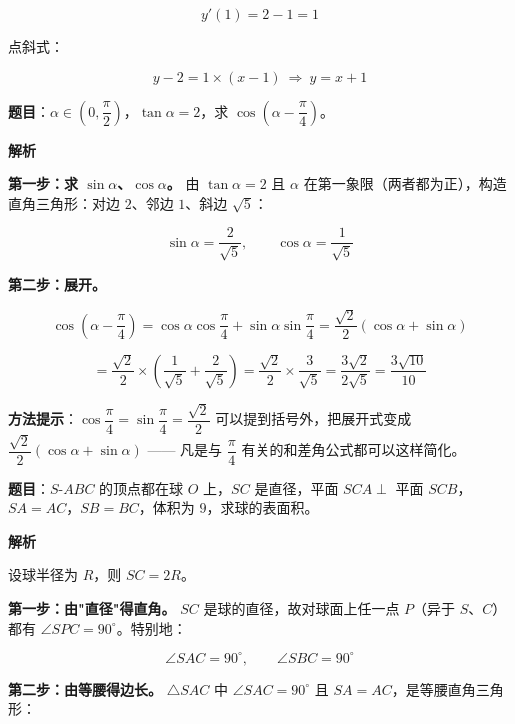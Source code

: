 \[y'(1)=2-1=1\]

点斜式：

\[y-2=1\times(x-1)\ \Longrightarrow\ y=x+1\]


\par\medskip


\textbf{题目}：$\alpha\in\left(0,\dfrac\pi2\right)$，$\tan\alpha=2$，求 $\cos\left(\alpha-\dfrac\pi4\right)$。

\textbf{解析}

\textbf{第一步：求 $\sin\alpha$、$\cos\alpha$。} 由 $\tan\alpha=2$ 且 $\alpha$ 在第一象限（两者都为正），构造直角三角形：对边 $2$、邻边 $1$、斜边 $\sqrt5$：

\[\sin\alpha=\frac2{\sqrt5},\qquad \cos\alpha=\frac1{\sqrt5}\]

\textbf{第二步：展开。}

\[\cos\left(\alpha-\frac\pi4\right)=\cos\alpha\cos\frac\pi4+\sin\alpha\sin\frac\pi4=\frac{\sqrt2}2\left(\cos\alpha+\sin\alpha\right)\]

\[=\frac{\sqrt2}2\times\left(\frac1{\sqrt5}+\frac2{\sqrt5}\right)=\frac{\sqrt2}2\times\frac3{\sqrt5}=\frac{3\sqrt2}{2\sqrt5}=\frac{3\sqrt{10}}{10}\]


\begin{gktip}
\textbf{方法提示}：$\cos\dfrac\pi4=\sin\dfrac\pi4=\dfrac{\sqrt2}2$ 可以提到括号外，把展开式变成 $\dfrac{\sqrt2}2(\cos\alpha+\sin\alpha)$ —— 凡是与 $\dfrac\pi4$ 有关的和差角公式都可以这样简化。
\end{gktip}

\par\medskip


\textbf{题目}：$S\text{-}ABC$ 的顶点都在球 $O$ 上，$SC$ 是直径，平面 $SCA\perp$ 平面 $SCB$，$SA=AC$，$SB=BC$，体积为 $9$，求球的表面积。

\textbf{解析}

设球半径为 $R$，则 $SC=2R$。

\textbf{第一步：由"直径"得直角。} $SC$ 是球的直径，故对球面上任一点 $P$（异于 $S$、$C$）都有 $\angle SPC=90^\circ$。特别地：

\[\angle SAC=90^\circ,\qquad \angle SBC=90^\circ\]

\textbf{第二步：由等腰得边长。} $\triangle SAC$ 中 $\angle SAC=90^\circ$ 且 $SA=AC$，是等腰直角三角形：

